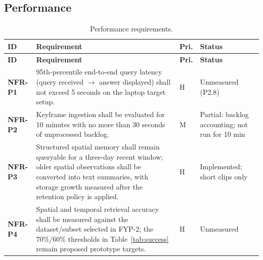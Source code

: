 \subsection{Performance}
\begin{ltab}
\begin{longtable}{@{}>{\bfseries}L{1.6cm}L{8.6cm}L{0.7cm}L{3.8cm}@{}}
\caption{Performance requirements.}\\
\toprule
{}\textbf{ID} & \textbf{Requirement} & \textbf{Pri.} & \textbf{Status}\\
\midrule
\endfirsthead
\toprule
{}\textbf{ID} & \textbf{Requirement} & \textbf{Pri.} & \textbf{Status}\\
\midrule
\endhead
\bottomrule
\endfoot
NFR-P1 & 95th-percentile end-to-end query latency (query received $\rightarrow$
answer displayed) shall not exceed 5 seconds on the laptop target setup. & H & Unmeasured (P2.8)\\
NFR-P2 & Keyframe ingestion shall be evaluated for 10 minutes with no more than 30 seconds of unprocessed backlog. & M & Partial: backlog accounting; not run for 10 min\\
NFR-P3 & Structured spatial memory shall remain queryable for a three-day recent window; older spatial observations shall be converted into text summaries, with storage growth measured after the retention policy is applied. & H & Implemented; short clips only\\
NFR-P4 & Spatial and temporal retrieval accuracy shall be measured against the dataset/subset selected in FYP-2; the 70\%/60\% thresholds in Table~\ref{tab:success} remain proposed prototype targets. & H & Unmeasured\\
\end{longtable}
\end{ltab}

